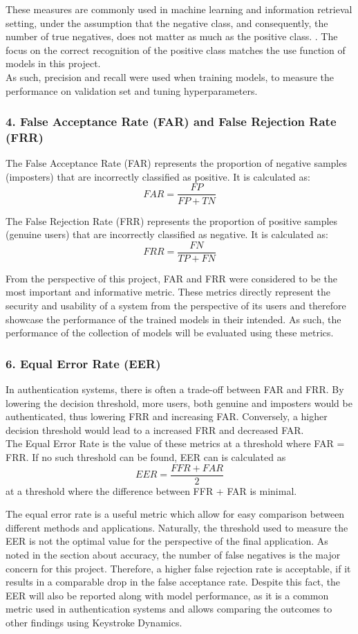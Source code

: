 These measures are commonly used in machine learning and information retrieval setting, under the assumption that the negative class, and consequently, the number of true negatives, does not matter as much as the positive class. . The focus on the correct recognition of the positive class matches the use function of models in this project.\\
As such, precision and recall were used when training models, to measure the performance on validation set and tuning hyperparameters.

\subsubsection{4. False Acceptance Rate (FAR) and False Rejection Rate (FRR)}
The False Acceptance Rate (FAR) represents the proportion of negative samples (imposters) that are incorrectly classified as positive. It is calculated as:
\[
FAR = \frac{FP}{FP + TN}
\]

The False Rejection Rate (FRR) represents the proportion of positive samples (genuine users) that are incorrectly classified as negative. It is calculated as:
\[
FRR = \frac{FN}{TP + FN}
\]

From the perspective of this project, FAR and FRR were considered to be the most important and informative metric. These metrics directly represent the security and usability of a system from the perspective of its users and therefore showcase the performance of the trained models in their intended. As such, the performance of the collection of models will be evaluated using these metrics. 

\subsubsection{6. Equal Error Rate (EER)}
In authentication systems, there is often a trade-off between FAR and FRR. By lowering the decision threshold, more users, both genuine and imposters would be authenticated, thus lowering FRR and increasing FAR. Conversely, a higher decision threshold would lead to a increased FRR and decreased FAR. \\
The Equal Error Rate is the value of these metrics at a threshold where FAR = FRR. If no such threshold can be found, EER can is calculated as  
\[
EER = \frac{FFR + FAR}{2}
\]
at a threshold where the difference between FFR + FAR is minimal.

The equal error rate is a useful metric which allow for easy comparison between different methods and applications. Naturally, the threshold used to measure the EER is not the optimal value for the perspective of the final application. As noted in the section about accuracy, the number of false negatives is the major concern for this project. Therefore, a higher false rejection rate is acceptable, if it results in a comparable drop in the false acceptance rate. Despite this fact, the EER will also be reported along with model performance, as it is a common metric used in authentication systems and allows comparing the outcomes to other findings using Keystroke Dynamics.


